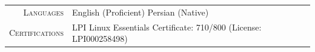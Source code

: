 
\vspace{2mm}

\begin{tabularx}{\textwidth}{r X}
  \textsc{Languages} &
  English (Proficient) \quad
  Persian (Native) \\[1mm]
  \textsc{Certifications} &
  LPI Linux Essentials Certificate: 710/800
  (License: LPI000258498) \\
\end{tabularx}
